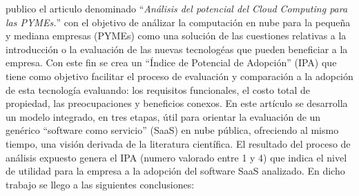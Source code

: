 \cite{ercolani} publico el articulo denominado ``\emph{An\'alisis del potencial del
Cloud Computing para las PYMEs.}'' con el objetivo de an\'alizar la computaci\'on en nube
para la peque\~na y mediana empresas (PYMEs) como una soluci\'on de las cuestiones relativas a la
introducci\'on o la evaluaci\'on de las nuevas tecnolog\'eas que pueden beneficiar a la empresa.
Con este fin se crea un ``\'Indice de Potencial de Adopci\'on'' (IPA) que tiene
como objetivo facilitar el proceso de evaluaci\'on y comparaci\'on a la adopci\'on de
esta tecnolog\'ia evaluando: los requisitos funcionales, el costo total de propiedad,
las preocupaciones y beneficios conexos.
En este art\'iculo se desarrolla un modelo integrado, en tres etapas, \'util para
orientar la evaluaci\'on de un gen\'erico ``software como servicio'' (SaaS) en nube
p\'ublica, ofreciendo al mismo tiempo, una visi\'on derivada de la literatura cient\'ifica.
El resultado del proceso de an\'alisis expuesto genera el IPA (numero valorado
entre 1 y 4) que indica el nivel de utilidad para la empresa a la adopci\'on del
software SaaS analizado. En dicho trabajo se llego a las siguientes conclusiones:
